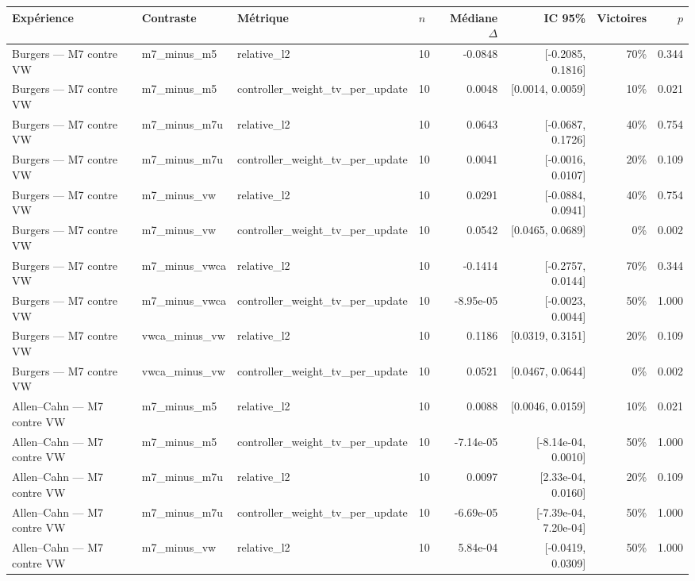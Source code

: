 \begin{tabular}{llllrrrr}
\toprule
Expérience & Contraste & Métrique & $n$ & Médiane $\Delta$ & IC 95\% & Victoires & $p$ \\
\midrule
Burgers — M7 contre VW & m7\_minus\_m5 & relative\_l2 & 10 & -0.0848 & [-0.2085, 0.1816] & 70\% & 0.344 \\
Burgers — M7 contre VW & m7\_minus\_m5 & controller\_weight\_tv\_per\_update & 10 & 0.0048 & [0.0014, 0.0059] & 10\% & 0.021 \\
Burgers — M7 contre VW & m7\_minus\_m7u & relative\_l2 & 10 & 0.0643 & [-0.0687, 0.1726] & 40\% & 0.754 \\
Burgers — M7 contre VW & m7\_minus\_m7u & controller\_weight\_tv\_per\_update & 10 & 0.0041 & [-0.0016, 0.0107] & 20\% & 0.109 \\
Burgers — M7 contre VW & m7\_minus\_vw & relative\_l2 & 10 & 0.0291 & [-0.0884, 0.0941] & 40\% & 0.754 \\
Burgers — M7 contre VW & m7\_minus\_vw & controller\_weight\_tv\_per\_update & 10 & 0.0542 & [0.0465, 0.0689] & 0\% & 0.002 \\
Burgers — M7 contre VW & m7\_minus\_vwca & relative\_l2 & 10 & -0.1414 & [-0.2757, 0.0144] & 70\% & 0.344 \\
Burgers — M7 contre VW & m7\_minus\_vwca & controller\_weight\_tv\_per\_update & 10 & -8.95e-05 & [-0.0023, 0.0044] & 50\% & 1.000 \\
Burgers — M7 contre VW & vwca\_minus\_vw & relative\_l2 & 10 & 0.1186 & [0.0319, 0.3151] & 20\% & 0.109 \\
Burgers — M7 contre VW & vwca\_minus\_vw & controller\_weight\_tv\_per\_update & 10 & 0.0521 & [0.0467, 0.0644] & 0\% & 0.002 \\
Allen–Cahn — M7 contre VW & m7\_minus\_m5 & relative\_l2 & 10 & 0.0088 & [0.0046, 0.0159] & 10\% & 0.021 \\
Allen–Cahn — M7 contre VW & m7\_minus\_m5 & controller\_weight\_tv\_per\_update & 10 & -7.14e-05 & [-8.14e-04, 0.0010] & 50\% & 1.000 \\
Allen–Cahn — M7 contre VW & m7\_minus\_m7u & relative\_l2 & 10 & 0.0097 & [2.33e-04, 0.0160] & 20\% & 0.109 \\
Allen–Cahn — M7 contre VW & m7\_minus\_m7u & controller\_weight\_tv\_per\_update & 10 & -6.69e-05 & [-7.39e-04, 7.20e-04] & 50\% & 1.000 \\
Allen–Cahn — M7 contre VW & m7\_minus\_vw & relative\_l2 & 10 & 5.84e-04 & [-0.0419, 0.0309] & 50\% & 1.000 \\

\end{tabular}
